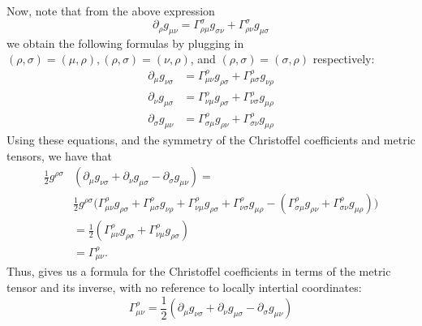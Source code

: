 \documentclass[12pt]{article}
\theoremstyle{definition}
\theoremstyle{remark}
\begin{document}
	Now, note that from the above expression 
	\[
	\partial_{ \rho } g_{ \mu \nu } = \Gamma_{ \rho \mu }^{ \sigma } g_{ \sigma \nu } + \Gamma_{ \rho \nu }^{ \sigma } g_{ \mu \sigma } 
	\]
	we obtain the following formulas by plugging in $(\rho, \sigma) = (\mu, \rho), (\rho, \sigma) = (\nu, \rho)$, and $(\rho, \sigma) = (\sigma, \rho)$ respectively:
	\begin{align*}
	\partial_{\mu} g_{ \nu \sigma } 
	&= 
	\Gamma^{\rho}_{ \mu \nu } g_{ \rho \sigma } 
	+
	\Gamma^{ \rho}_{ \mu \sigma } g_{ \nu \rho } 
	\\
	\partial_{ \nu } g_{ \mu \sigma } 
	&=
	\Gamma^{ \rho }_{ \nu \mu } g_{ \rho \sigma } 
	+
	\Gamma^{ \rho }_{ \nu \sigma } g_{ \mu \rho } 
	\\
	\partial_{ \sigma } g_{ \mu \nu } 
	&=
	\Gamma^{ \rho }_{ \sigma \mu } g_{\rho \nu } 
	+
	\Gamma^{ \rho }_{ \sigma \nu } g_{ \mu \rho } 
	\end{align*}
	Using these equations, and the symmetry of the Christoffel coefficients and metric tensors, we have that 
	\begin{align*}
	\frac{1}{2} g^{ \rho \sigma } &\left( \partial_{ \mu } g_{ \nu \sigma } + \partial_{ \nu } g_{ \mu \sigma } - \partial_{ \sigma } g_{ \mu \nu } \right) = \\
	& \frac{ 1}{2} g^{ \rho \sigma } \Big( \Gamma^{\rho}_{ \mu \nu } g_{ \rho \sigma } 
	+
	\Gamma^{ \rho}_{ \mu \sigma } g_{ \nu \rho } 
	+ 
	\Gamma^{ \rho }_{ \nu \mu } g_{ \rho \sigma } 
	+
	\Gamma^{ \rho }_{ \nu \sigma } g_{ \mu \rho } 
	-
	\left( \Gamma^{ \rho }_{ \sigma \mu } g_{\rho \nu } 
	+
	\Gamma^{ \rho }_{ \sigma \nu } g_{ \mu \rho } 
	\right) \Big) \\
	&= \frac{1}{2} \left( \Gamma^{ \rho }_{ \mu \nu } g_{ \rho \sigma } + \Gamma^{ \rho }_{ \nu \mu } g_{ \rho \sigma } \right)  \\
	&=  \Gamma^{ \rho }_{ \mu \nu }.
	\end{align*}
	Thus, gives us a formula for the Christoffel coefficients in terms of the metric tensor and its inverse, with no reference to locally intertial coordinates:
	\[
	\Gamma_{ \mu \nu }^{ \rho } = \frac{1}{2} \left( \partial_{ \mu } g_{ \nu \sigma } + \partial_{ \nu } g_{ \mu \sigma } - \partial_{ \sigma } g_{ \mu \nu } \right) 
	\]
\end{document}
